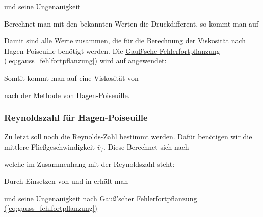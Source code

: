 
und seine Ungenauigkeit


Berechnet man mit den bekannten Werten die Druckdifferent, so kommt man auf


Damit sind alle Werte zusammen, die für die Berechnung der Viskosität nach Hagen-Poiseuille benötigt werden. 
Die \hyperref[eq:gauss_fehlfortpflanzung]{Gauß'sche Fehlerfortpflanzung (\ref*{eq:gauss_fehlfortpflanzung})} wird auf  angewendet:


Somtit kommt man auf eine Viskosität von


nach der Methode von Hagen-Poiseuille.

\subsubsection{Reynoldszahl für Hagen-Poiseuille}
Zu letzt soll noch die Reynolds-Zahl bestimmt werden. Dafür benötigen wir die mittlere Fließgeschwindigkeit $\overline{v}_f$. Diese Berechnet sich nach


welche im Zusammenhang mit der Reynoldszahl steht:


Durch Einsetzen von  und  in  erhält man


und seine Ungenauigkeit nach \hyperref[eq:gauss_fehlfortpflanzung]{Gauß'scher Fehlerfortpflanzung (\ref*{eq:gauss_fehlfortpflanzung})}

